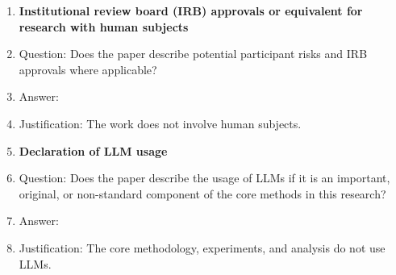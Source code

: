 \begin{enumerate}
\item {\bf Institutional review board (IRB) approvals or equivalent for research with human subjects}
    \item[] Question: Does the paper describe potential participant risks and IRB approvals where applicable?
    \item[] Answer: \answerNA{}
    \item[] Justification: The work does not involve human subjects.

\item {\bf Declaration of LLM usage}
    \item[] Question: Does the paper describe the usage of LLMs if it is an important, original, or non-standard component of the core methods in this research?
    \item[] Answer: \answerNA{}
    \item[] Justification: The core methodology, experiments, and analysis do not use LLMs.

\end{enumerate}
